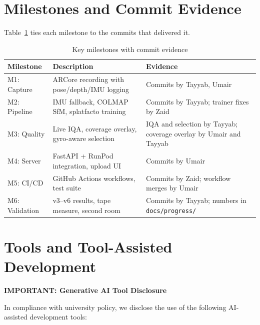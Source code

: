 \section{Milestones and Commit Evidence}

Table~\ref{tab:milestones} ties each milestone to the commits that delivered it.

\begin{table}[htbp]
\centering
\small
\caption{Key milestones with commit evidence}
\label{tab:milestones}
\begin{tabular}{p{2.5cm}p{5cm}p{4cm}}
\toprule
\textbf{Milestone} & \textbf{Description} & \textbf{Evidence} \\
\midrule
M1: Capture & ARCore recording with pose/depth/IMU logging & Commits by Tayyab, Umair \\
M2: Pipeline & IMU fallback, COLMAP SfM, splatfacto training & Commits by Tayyab; trainer fixes by Zaid \\
M3: Quality & Live IQA, coverage overlay, gyro-aware selection & IQA and selection by Tayyab; coverage overlay by Umair and Tayyab \\
M4: Server & FastAPI + RunPod integration, upload UI & Commits by Umair \\
M5: CI/CD & GitHub Actions workflows, test suite & Commits by Zaid; workflow merges by Umair \\
M6: Validation & v3--v6 results, tape measure, second room & Commits by Tayyab; numbers in \texttt{docs/progress/} \\
\bottomrule
\end{tabular}
\end{table}

\section{Tools and Tool-Assisted Development}

\textbf{IMPORTANT: Generative AI Tool Disclosure}

In compliance with university policy, we disclose the use of the following AI-assisted development tools:

